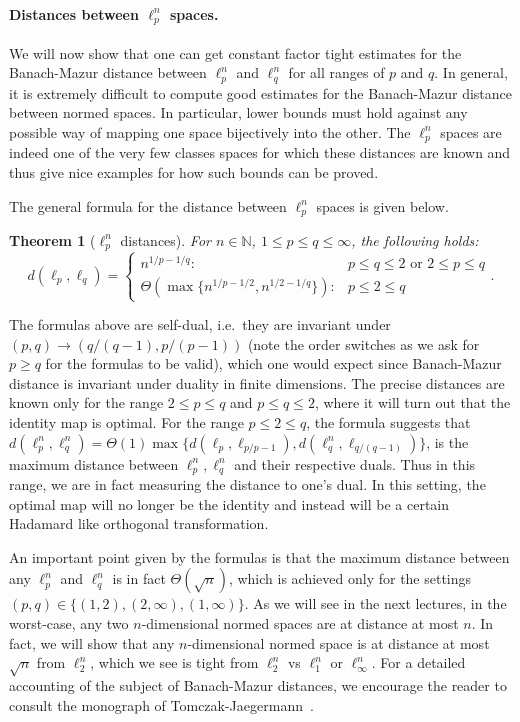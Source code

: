 \documentclass[11pt]{article}
\newtheorem{theorem}{Theorem}
\theoremstyle{plain}
\theoremstyle{plain}
\newcommand{\set}[1]{\{{#1}\}}
\newcommand{\N}{\ensuremath{\mathbb{N}}}
\begin{document}
\paragraph{\bf Distances between $\ell_p^n$ spaces.}

We will now show that one can get constant factor tight estimates for the
Banach-Mazur distance between $\ell_p^n$ and $\ell_q^n$ for all ranges of $p$
and $q$. In general, it is extremely difficult to compute good estimates for the
Banach-Mazur distance between normed spaces. In particular, lower bounds must
hold against any possible way of mapping one space bijectively into the other.
The $\ell_p^n$ spaces are indeed one of the very few classes spaces for which
these distances are known and thus give nice examples for how such bounds can be
proved. 

The general formula for the distance between $\ell_p^n$ spaces is given below. 

\begin{theorem}[$\ell_p^n$ distances]
\label{thm:p-q-distance}
For $n \in \N$, $1 \leq p \leq q \leq \infty$, the following holds:
\begin{equation}
\label{eq:p-q-distance}
d(\ell_p,\ell_q) = \begin{cases}  n^{1/p-1/q}:& p \leq q \leq 2 \text{ or }
2 \leq p \leq q \\
\Theta(\max \set{n^{1/p-1/2},n^{1/2-1/q}}):& p \leq 2 \leq q
\end{cases}.
\end{equation}
\end{theorem}

The formulas above are self-dual, i.e.~they are invariant under $(p,q)
\rightarrow (q/(q-1),p/(p-1))$ (note the order switches as we ask for $p \geq q$
for the formulas to be valid), which one would expect since Banach-Mazur
distance is invariant under duality in finite dimensions. The precise distances
are known only for the range $2 \leq p \leq q$ and $p \leq q \leq 2$, where it
will turn out that the identity map is optimal. For the range $p \leq 2 \leq q$,
the formula suggests that $d(\ell_p^n,\ell_q^n) = \Theta(1) \max
\set{d(\ell_p,\ell_{p/p-1}),d(\ell_q^n,\ell_{q/(q-1)})}$, is the maximum
distance between $\ell_p^n,\ell_q^n$ and their respective duals. Thus in this
range, we are in fact measuring the distance to one's dual. In this setting, the
optimal map will no longer be the identity and instead will be a certain
Hadamard like orthogonal transformation.

An important point given by the formulas is that the maximum distance between
any $\ell_p^n$ and $\ell_q^n$ is in fact $\Theta(\sqrt{n})$, which is achieved
only for the settings $(p,q) \in \set{(1,2),(2,\infty),(1,\infty)}$. As we will
see in the next lectures, in the worst-case, any two $n$-dimensional normed
spaces are at distance at most $n$. In fact, we will show that any
$n$-dimensional normed space is at distance at most $\sqrt{n}$ from $\ell_2^n$,
which we see is tight from $\ell_2^n$ vs $\ell_1^n$ or $\ell_\infty^n$. For a
detailed accounting of the subject of Banach-Mazur distances, we encourage the
reader to consult the monograph of Tomczak-Jaegermann~\cite{TJ89}.
\end{document}
